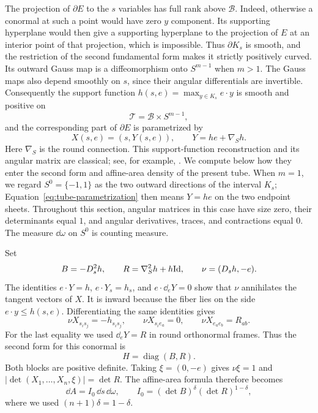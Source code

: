 The projection of $\partial E$ to the $s$ variables has full rank above
$\mathcal B$.  Indeed, otherwise a conormal at such a point would have
zero $y$ component.  Its supporting hyperplane would then give a
supporting hyperplane to the projection of $E$ at an interior point of
that projection, which is impossible.  Thus $\partial K_s$ is smooth,
and the restriction of the second fundamental form makes it strictly
positively curved.  Its outward Gauss map is a diffeomorphism onto
$S^{m-1}$ when $m>1$.  The Gauss maps also depend smoothly on $s$, since
their angular differentials are invertible.  Consequently the support
function $h(s,e)=\max_{y\in K_s}e\cdot y$ is smooth and positive on
\[
 \mathcal T=\mathcal B\times S^{m-1},
\]
and the corresponding part of $\partial E$ is parametrized by
\begin{equation}\label{eq:tube-parametrization}
 X(s,e)=(s,Y(s,e)),
 \qquad Y=he+\nabla_S h.
\end{equation}
Here $\nabla_S$ is the round connection. This support-function
reconstruction and its angular matrix are classical; see, for example,
\cite[preprint version, Section~7, Equations~(7.15)--(7.17)]{TW2005}.
We compute below
how they enter the second form and affine-area density of the present
tube. When $m=1$, we regard
$S^0=\{-1,1\}$ as the two outward directions of the interval $K_s$;
Equation~\eqref{eq:tube-parametrization} then means $Y=he$ on the two
endpoint sheets.  Throughout this section, angular matrices in this
case have size zero, their determinants equal $1$, and angular
derivatives, traces, and contractions equal $0$.  The measure
$\dd\omega$ on $S^0$ is counting measure.

Set
\[
 B=-D_s^2h,
 \qquad R=\nabla_S^2h+h\mathrm{Id},
 \qquad \nu=(D_sh,-e).
\]
The identities $e\cdot Y=h$, $e\cdot Y_s=h_s$, and
$e\cdot\dd_eY=0$ show that $\nu$ annihilates the tangent vectors of
$X$.  It is inward because the fiber lies on the side
$e\cdot y\le h(s,e)$.  Differentiating the same identities gives
\[
 \nu X_{s_i s_j}=-h_{s_i s_j},
 \qquad \nu X_{s_i e_a}=0,
 \qquad \nu X_{e_a e_b}=R_{ab}.
\]
For the last equality we used $\dd_eY=R$ in round orthonormal frames.
Thus the second form for this conormal is
\begin{equation}\label{eq:tube-second-form}
 H=\operatorname{diag}(B,R).
\end{equation}
Both blocks are positive definite.  Taking $\xi=(0,-e)$ gives
$\nu\xi=1$ and
$|\det(X_1,\ldots,X_n,\xi)|=\det R$.  The affine-area formula therefore
becomes
\begin{equation}\label{eq:tube-area}
 \dd A=I_0\,\dd s\,\dd\omega,
 \qquad I_0=(\det B)^\delta(\det R)^{1-\delta},
\end{equation}
where we used $(n+1)\delta=1-\delta$.

